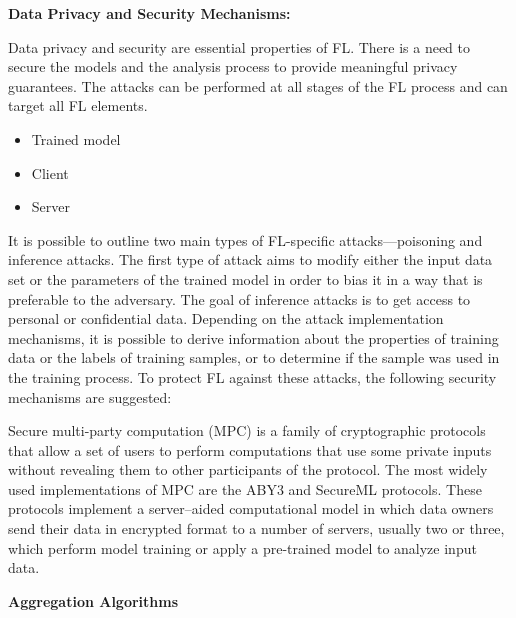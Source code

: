 \documentclass[14pt]{extarticle}
\begin{document}
\textbf{Data Privacy and Security Mechanisms:}

\par Data privacy and security are essential properties of FL. There is a need to secure the models and the analysis process to provide meaningful privacy guarantees. The attacks can be performed at all stages of the FL process and can target all FL elements.

\begin{itemize}
    \item Trained model
    \item Client
    \item Server
\end{itemize}

\par It is possible to outline two main types of FL-specific attacks—poisoning and inference attacks. The first type of attack aims to modify either the input data set or the parameters of the trained model in order to bias it in a way that is preferable to the adversary. The goal of inference attacks is to get access to personal or confidential data. Depending on the attack implementation mechanisms, it is possible to derive information about the properties of training data or the labels of training samples, or to determine if the sample was used in the training process. To protect FL against these attacks, the following security mechanisms are suggested: 
\par Secure multi-party computation (MPC) is a family of cryptographic protocols that allow a set of users to perform computations that use some private inputs without revealing them to other participants of the protocol. The most widely used implementations of MPC are the ABY3 and SecureML protocols. These protocols implement a server–aided computational model in which data owners send their data in encrypted format to a number of servers, usually two or three, which perform model training or apply a pre-trained model to analyze input data.

\textbf{Aggregation Algorithms}
\end{document}
